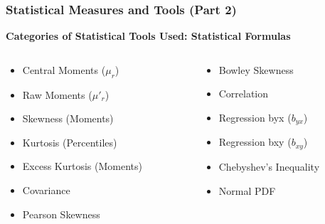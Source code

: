 \begin{frame}
    \frametitle{Statistical Measures and Tools (Part 2)}
    \textbf{Categories of Statistical Tools Used: Statistical Formulas}
    \begin{columns}
        \begin{column}{0.5\textwidth}
            \begin{itemize}
                \item Central Moments ($\mu_r$)
                \item Raw Moments ($\mu'_r$)
                \item Skewness (Moments)
                \item Kurtosis (Percentiles)
                \item Excess Kurtosis (Moments)
                \item Covariance
                \item Pearson Skewness
            \end{itemize}
        \end{column}
        \begin{column}{0.5\textwidth}
            \begin{itemize}
                \item Bowley Skewness
                \item Correlation
                \item Regression byx ($b_{yx}$)
                \item Regression bxy ($b_{xy}$)
                \item Chebyshev's Inequality
                \item Normal PDF
            \end{itemize}
        \end{column}
    \end{columns}
\end{frame}

